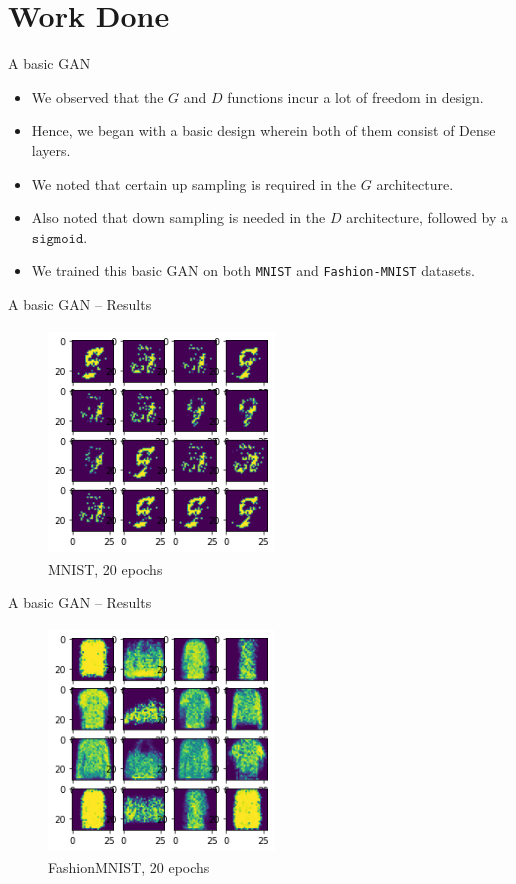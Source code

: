 \documentclass[handout]{beamer}
\begin{document}
\section{Work Done}
\begin{frame}{A basic GAN}
\begin{itemize}
    \item We observed that the $G$ and $D$ functions incur a lot of freedom in design.\pause
    \item Hence, we began with a basic design wherein both of them consist of Dense layers.\pause 
    \item We noted that certain up sampling is required in the $G$ architecture.\pause
    \item Also noted that down sampling is needed in the $D$ architecture, followed by a $\texttt{sigmoid}$. \pause
    \item We trained this basic GAN on both \texttt{MNIST} and \texttt{Fashion-MNIST} datasets.
    
\end{itemize}
\end{frame}
\begin{frame}{A basic GAN -- Results}
    
    \begin{figure}[H]
        \centering
        \includegraphics[height = 6cm, width = 6cm]{2nd_attempt_mnist_20epoc.png}
        \caption{MNIST, 20 epochs}
        \label{fig:my_label}
    \end{figure}
\end{frame}
\begin{frame}{A basic GAN -- Results}
    
    \begin{figure}[H]
        \centering
        \includegraphics[height = 6cm, width = 6cm]{on_f_mnist.png}
        \caption{FashionMNIST, 20 epochs}
        \label{fig:my_label}
    \end{figure}
\end{frame}
\end{document}
